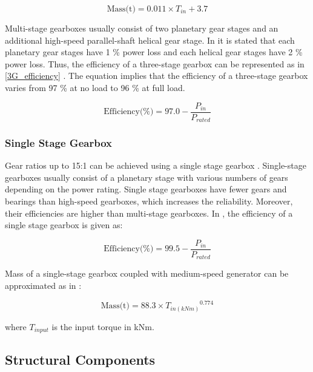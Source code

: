 \documentclass{article}\usepackage{graphicx, color}
\begin{document}
\begin{equation}
\text{Mass(t)} = 0.011 \times T_{in} + 3.7
\label{3G_gearbox}
\end{equation}


Multi-stage gearboxes usually consist of two planetary gear stages and an additional high-speed parallel-shaft helical gear stage. In \cite{Hau2005a} it is stated that each planetary gear stages have 1 \% power loss and each helical gear stages have 2 \% power loss. Thus, the efficiency of a three-stage gearbox can be represented as in \autoref{3G_efficiency} \cite{Zhang2011a}. The equation implies that the efficiency of a three-stage gearbox varies from 97 \% at no load to 96 \% at full load.

\begin{equation}
  \text{Efficiency(\%)} = 97.0 - \dfrac{P_{in}}{P_{rated}}
  \label{3G_efficiency}
\end{equation}

\subsubsection{Single Stage Gearbox}

Gear ratios up to 15:1 can be achieved using a single stage gearbox \cite{Cotrell2002}. Single-stage gearboxes usually consist of a planetary stage with various numbers of gears depending on the power rating. Single stage gearboxes have fewer gears and bearings than high-speed gearboxes, which increases the reliability. Moreover, their efficiencies are higher than multi-stage gearboxes. In \cite{Matveev2011}, the efficiency of a single stage gearbox is given as:

\begin{equation}
  \text{Efficiency(\%)} = 99.5 - \dfrac{P_{in}}{P_{rated}}
\end{equation}

Mass of a single-stage gearbox coupled with medium-speed generator can be approximated as in \cite{Fingersh2006}:

\begin{equation}
	\text{Mass(t)} = 88.3 \times {T_{in(kNm)}}^{0.774}
\end{equation}

where $T_{input}$ is the input torque in kNm.


\subsection{Structural Components}
\end{document}
